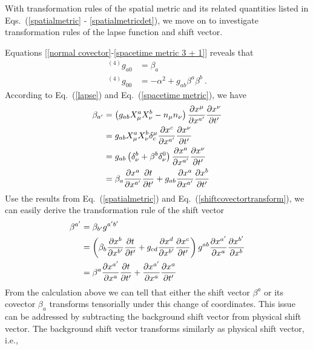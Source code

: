 With transformation rules of the spatial metric and its related quantities listed in Eqs.~(\ref{spatialmetric} - \ref{spatialmetricdet}), we move on to investigate transformation rules of the lapse function and shift vector. 

Equations [\ref{normal covector}-\ref{spacetime metric 3 + 1}] reveals that
\begin{align}
^{\left(4\right)}g_{a0} & = \beta_{a}\label{lapse}\\
^{\left(4\right)}g_{00} & = -\alpha^2 + g_{ab}\beta^{a}\beta^{b}\label{shift} \ .
\end{align}
According to Eq.~(\ref{lapse}) and Eq.~(\ref{spacetime metric}), we have
\begin{align}
\beta_{a'} & = \left(g_{ab}X^{a}_{\mu}X^{b}_{\nu} - n_{\mu}n_{\nu}\right)\frac{\partial x^{\mu}}{\partial x^{a'}}\frac{\partial x^{\nu}}{\partial t'}\notag\\
& = g_{ab}X^{a}_{\mu}X^{b}_{\nu}\delta_{c}^{\mu}\frac{\partial x^{c}}{\partial x^{a'}}\frac{\partial x^{\nu}}{\partial t'}\notag\\
& = g_{ab}\left(\delta^{b}_{\nu} + \beta^{b}\delta^{0}_{\nu}\right)\frac{\partial x^{a}}{\partial x^{a'}}\frac{\partial x^{\nu}}{\partial t'}\notag\\
& = \beta_{a}\frac{\partial x^{a}}{\partial x^{a'}}\frac{\partial t}{\partial t'} + g_{ab}\frac{\partial x^{a}}{\partial x^{a'}}\frac{\partial x^{b}}{\partial t'}\label{shiftcovectortransform}
\end{align}
Use the results from Eq.~(\ref{spatialmetric}) and Eq.~(\ref{shiftcovectortransform}), we can easily derive the transformation rule of the shift vector
\begin{align}
\beta^{a'} & = \beta_{b'}g^{a'b'}\notag\\
& = \left(\beta_{b}\frac{\partial x^{b}}{\partial x^{b'}}\frac{\partial t}{\partial t'} + g_{cd}\frac{\partial x^{d}}{\partial x^{b'}}\frac{\partial x^{c}}{\partial t'}\right)g^{ab}\frac{\partial x^{a'}}{\partial x^{a}}\frac{\partial x^{b'}}{\partial x^{b}}\notag\\
& = \beta^{a}\frac{\partial x^{a'}}{\partial x^{a}}\frac{\partial t}{\partial t'} + \frac{\partial x^{a'}}{\partial x^{a}}\frac{\partial x^{a}}{\partial t'}\label{shiftvectortransform}
\end{align}
From the calculation above we can tell that either the shift vector $\beta^{a}$ or its covector $\beta_{a}$ transforms tensorially under this change of coordinates. This issue can be addressed by subtracting the background shift vector from physical shift vector. The background shift vector transforms similarly as physical shift vector, i.e., 
